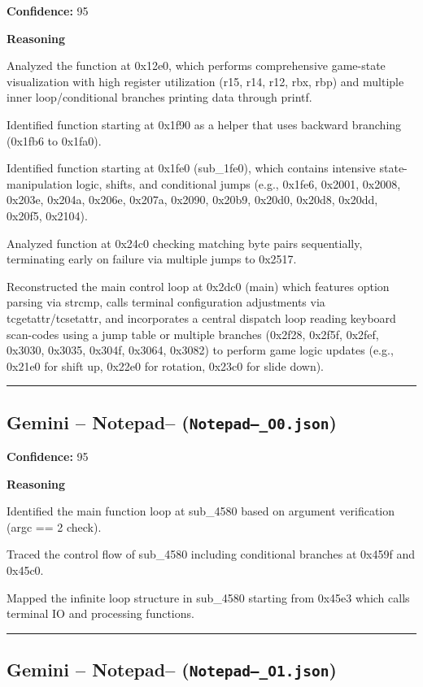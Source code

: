 \textbf{Confidence:} 95

\textbf{Reasoning}

Analyzed the function at 0x12e0, which performs comprehensive game-state visualization with high register utilization (r15, r14, r12, rbx, rbp) and multiple inner loop/conditional branches printing data through printf.

Identified function starting at 0x1f90 as a helper that uses backward branching (0x1fb6 to 0x1fa0).

Identified function starting at 0x1fe0 (sub\_1fe0), which contains intensive state-manipulation logic, shifts, and conditional jumps (e.g., 0x1fe6, 0x2001, 0x2008, 0x203e, 0x204a, 0x206e, 0x207a, 0x2090, 0x20b9, 0x20d0, 0x20d8, 0x20dd, 0x20f5, 0x2104).

Analyzed function at 0x24c0 checking matching byte pairs sequentially, terminating early on failure via multiple jumps to 0x2517.

Reconstructed the main control loop at 0x2dc0 (main) which features option parsing via strcmp, calls terminal configuration adjustments via tcgetattr/tcsetattr, and incorporates a central dispatch loop reading keyboard scan-codes using a jump table or multiple branches (0x2f28, 0x2f5f, 0x2fef, 0x3030, 0x3035, 0x304f, 0x3064, 0x3082) to perform game logic updates (e.g., 0x21e0 for shift up, 0x22e0 for rotation, 0x23c0 for slide down).

\bigskip
\hrule
\bigskip

\subsection{Gemini -- Notepad-- (\texttt{Notepad--\_O0.json})}

\textbf{Confidence:} 95

\textbf{Reasoning}

Identified the main function loop at sub\_4580 based on argument verification (argc == 2 check).

Traced the control flow of sub\_4580 including conditional branches at 0x459f and 0x45c0.

Mapped the infinite loop structure in sub\_4580 starting from 0x45e3 which calls terminal IO and processing functions.

\bigskip
\hrule
\bigskip

\subsection{Gemini -- Notepad-- (\texttt{Notepad--\_O1.json})}

